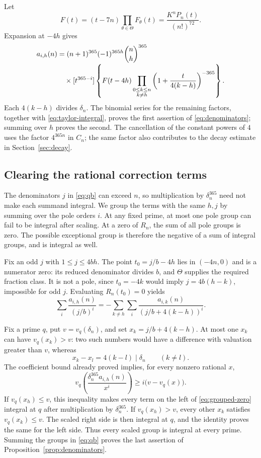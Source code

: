 Let
\[
 F(t)=(t-7n)\prod_{\theta\in\Theta}F_\theta(t)
     =\frac{K^nP_n(t)}{(n!)^{72}}.
\]
Expansion at $-4h$ gives
\begin{align}
 a_{i,h}(n)
  &=(n+1)^{365}(-1)^{365h}\binom nh^{365}\notag\\[-2pt]
  &\quad\times[t^{365-i}]
   \left\{F(t-4h)
      \prod_{\substack{0\leq k\leq n\\k\ne h}}
       \left(1+\frac{t}{4(k-h)}\right)^{-365}\right\}.
       \label{eq:local-coefficient}
\end{align}
Each $4(k-h)$ divides $\delta_n$. The binomial series for the remaining
factors, together with \eqref{eq:taylor-integral}, proves the first
assertion of \eqref{eq:denominators}; summing over $h$ proves the second.
The cancellation of the constant powers of $4$ uses the factor
$4^{365n}$ in $C_n$; the same factor also contributes to the decay
estimate in Section~\ref{sec:decay}.

\subsection{Clearing the rational correction terms}

The denominators $j$ in \eqref{eq:qb} can exceed $n$, so multiplication
by $\delta_n^{365}$ need not make each summand integral. We group the
terms with the same $h,j$ by summing over the pole orders $i$.
At any fixed prime, at most one pole group can fail to be integral after
scaling. At a zero of $R_n$, the sum of all pole groups is zero.
The possible exceptional group is therefore the negative of a sum of
integral groups, and is integral as well.

Fix an odd $j$ with $1\leq j\leq4bh$. The point $t_0=j/b-4h$ lies in
$(-4n,0)$ and is a numerator zero: its reduced denominator divides $b$,
and $\Theta$ supplies the required fraction class. It is not a pole,
since $t_0=-4k$ would imply $j=4b(h-k)$, impossible for odd $j$.
Evaluating $R_n(t_0)=0$ yields
\begin{equation}\label{eq:grouped-zero}
 \sum_i\frac{a_{i,h}(n)}{(j/b)^i}
 =-\sum_{k\ne h}\sum_i
            \frac{a_{i,k}(n)}{(j/b+4(k-h))^i}.
\end{equation}

Fix a prime $q$, put $v=v_q(\delta_n)$, and set $x_k=j/b+4(k-h)$.
At most one $x_k$ can have $v_q(x_k)>v$: two such numbers would have
a difference with valuation greater than $v$, whereas
\[
 x_k-x_l=4(k-l)\mid\delta_n\qquad(k\ne l).
\]
The coefficient bound already proved implies, for every nonzero rational $x$,
\begin{equation}\label{eq:valuation-group}
 v_q\left(\frac{\delta_n^{365}a_{i,h}(n)}{x^i}\right)
       \geq i\bigl(v-v_q(x)\bigr).
\end{equation}
If $v_q(x_h)\leq v$, this inequality makes every term on the left of
\eqref{eq:grouped-zero} integral at $q$ after multiplication by
$\delta_n^{365}$. If $v_q(x_h)>v$, every other $x_k$ satisfies
$v_q(x_k)\leq v$. The scaled right side is then
integral at $q$, and the identity proves the same for the left side.
Thus every scaled group is integral at every prime. Summing the groups
in \eqref{eq:qb} proves the last assertion of
Proposition~\ref{prop:denominators}.
